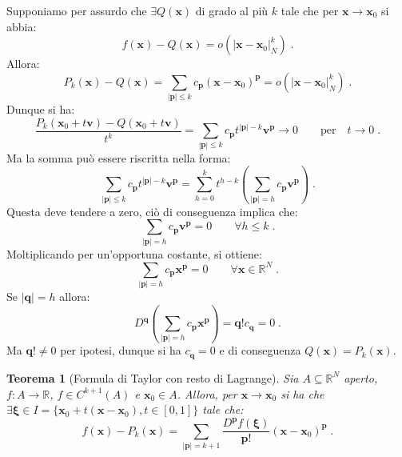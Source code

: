 \documentclass[a4paper,12pt]{report}
\theoremstyle{plain}
\newtheorem{thm}{Teorema}[section]
\theoremstyle{definition}
\theoremstyle{remark}
\newcommand{\BF}[1]{\boldsymbol{#1}}
\numberwithin{equation}{section}
\begin{document}
Supponiamo per assurdo che $\exists Q(\mathbf{x})$ di grado al più $k$ tale che per $\mathbf{x} \to \mathbf{x}_0$ si abbia:
\begin{equation}
f(\mathbf{x})-Q(\mathbf{x})=o(|\mathbf{x}-\mathbf{x}_0|_N^k)\;.
\end{equation}
Allora:
\begin{equation}
P_k(\mathbf{x})-Q(\mathbf{x})=\sum_{|\mathbf{p}|\le k} c_{\mathbf{p}}(\mathbf{x}-\mathbf{x}_0)^{\mathbf{p}}=o(|\mathbf{x}-
\mathbf{x}_0|_N^k)\;.
\end{equation}
Dunque si ha:
\begin{equation}
\frac{P_k(\mathbf{x}_0+t\mathbf{v})-Q(\mathbf{x}_0+t\mathbf{v})}{t^k} = \sum_{|\mathbf{p}|\le k} c_{\mathbf{p}} t^{|\mathbf{p}|-k}
\mathbf{v}^{\mathbf{p}} \to 0 \qquad \mbox{per}\quad t \to 0\;.
\end{equation}
Ma la somma può essere riscritta nella forma:
\begin{equation}
\sum_{|\mathbf{p}|\le k} c_{\mathbf{p}} t^{|\mathbf{p}|-k}\mathbf{v}^{\mathbf{p}}=\sum_{h=0}^k t^{h-k} \left(\sum_{|\mathbf{p}|=h} c_{\mathbf{p}} \mathbf{v}^{\mathbf{p}}\right)\;.
\end{equation}
Questa deve tendere a zero, ciò di conseguenza implica che:
\begin{equation}
\sum_{|\mathbf{p}|=h} c_{\mathbf{p}} \mathbf{v}^{\mathbf{p}}=0 \qquad \forall h \le k\;.
\end{equation}
Moltiplicando per un'opportuna costante, si ottiene:
\begin{equation}
\sum_{|\mathbf{p}|=h} c_{\mathbf{p}}\mathbf{x}^{\mathbf{p}}=0 \qquad \forall \mathbf{x} \in \mathbb{R}^N\;.
\end{equation}
Se $|\mathbf{q}|=h$ allora:
\begin{equation}
D^{\mathbf{q}}\left(\sum_{|\mathbf{p}|=h} c_{\mathbf{p}} \mathbf{x}^{\mathbf{p}}\right)= \mathbf{q}!c_{\mathbf{q}}=0\;.
\end{equation}
Ma $\mathbf{q}! \ne 0$ per ipotesi, dunque si ha $c_{\mathbf{q}}=0$ e di conseguenza $Q(\mathbf{x})=P_k(\mathbf{x})$.
\endproof
\begin{thm}[Formula di Taylor con resto di Lagrange] Sia $A \subseteq \mathbb{R}^N$ aperto, $f:A \to \mathbb{R}$, $f \in C^{k+1}(A)$ e $\mathbf{x}_0 \in A$. Allora, per $\mathbf{x} \to \mathbf{x}_0$ si ha che $\exists \BF{\xi} \in I=\{\mathbf{x}_0+t(\mathbf{x}-\mathbf{x}_0),t\in [0,1]\}$ tale che:
\begin{equation}
f(\mathbf{x})-P_k(\mathbf{x})=\sum_{|\mathbf{p}|=k+1} \frac{D^{\mathbf{p}}f(\BF{\xi})}{\mathbf{p}!} (\mathbf{x}-\mathbf{x}_0)^
{\mathbf{p}}\;.
\end{equation}
\end{thm}
\end{document}
